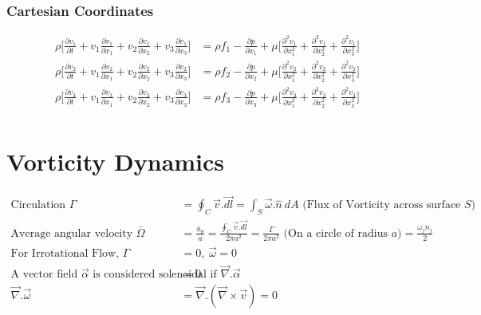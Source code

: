 \documentclass[10pt, letterpaper, notitlepage, landscape]{article}
\begin{document}
\subsubsection{Cartesian Coordinates}
\begin{align*}
\rho \biggl[ \frac{\partial v_1}{\partial t} + v_1 \frac{\partial v_1}{\partial x_1} + v_2 \frac{\partial v_1}{\partial x_2} + v_3 \frac{\partial v_1}{\partial x_3} \biggr] &= \rho f_1 - \frac{\partial p}{\partial x_1} + \mu \biggl[ \frac{\partial^2 v_1}{\partial x^2_1} + \frac{\partial^2 v_1}{\partial x^2_2} + \frac{\partial^2 v_1}{\partial x^2_3} \biggr] \\
\rho \biggl[ \frac{\partial v_2}{\partial t} + v_1 \frac{\partial v_2}{\partial x_1} + v_2 \frac{\partial v_2}{\partial x_2} + v_3 \frac{\partial v_2}{\partial x_3} \biggr] &= \rho f_2 - \frac{\partial p}{\partial x_2} + \mu \biggl[ \frac{\partial^2 v_2}{\partial x^2_1} + \frac{\partial^2 v_2}{\partial x^2_2} + \frac{\partial^2 v_2}{\partial x^2_3} \biggr] \\
\rho \biggl[ \frac{\partial v_3}{\partial t} + v_1 \frac{\partial v_3}{\partial x_1} + v_2 \frac{\partial v_3}{\partial x_2} + v_3 \frac{\partial v_3}{\partial x_3} \biggr] &= \rho f_3 - \frac{\partial p}{\partial x_3} + \mu \biggl[ \frac{\partial^2 v_3}{\partial x^2_1} + \frac{\partial^2 v_3}{\partial x^2_2} + \frac{\partial^2 v_3}{\partial x^2_3} \biggr] \\
\end{align*}
  

\section{Vorticity Dynamics}
\begin{align*}
\text{Circulation } \Gamma &= \oint_{C}^{} \vec{v} . \vec{dl} = \int_{S}^{} \vec{\omega}.\hat{n}\ dA \text{ (Flux of Vorticity across surface } S \text{)}\\ 
\text{Average angular velocity } \bar{\Omega} &= \frac{\bar{u}_{\theta}}{a} = \frac{\oint_{C}^{} \vec{v}.\vec{dl}}{2 \pi a^2} =  \frac{\Gamma}{2 \pi a^2} \text{ (On a circle of radius } a\text{)} = \frac{{\omega}_j n_j}{2}\\
\text{For Irrotational Flow, } \Gamma &= 0,\ \vec{\omega} = 0 \\
\text{A vector field } \vec{\alpha} \text{ is considered solenoidal if } \vec{\nabla} . \vec{\alpha} &= 0 \\
\vec{\nabla}.\vec{\omega} &= \vec{\nabla}.(\vec{\nabla} \times \vec{v}) = 0 \\
\end{align*}
\end{document}
